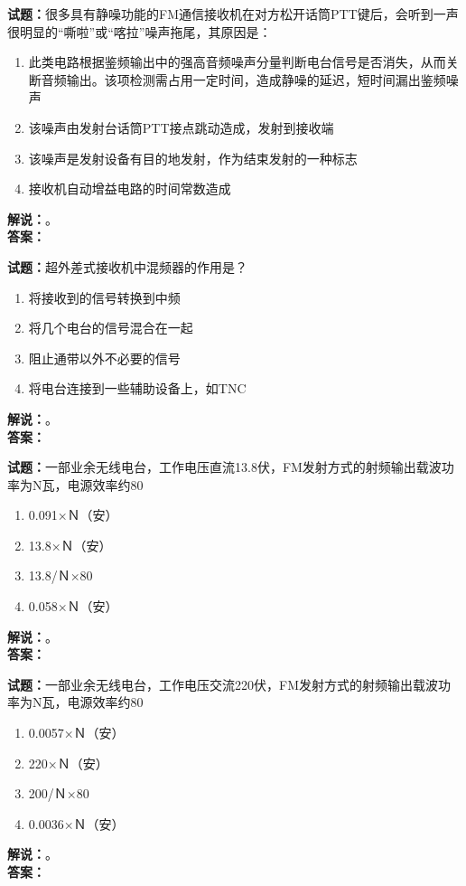 \documentclass{ctexbook}
\begin{document}
\bigskip

\noindent\textbf{试题：}很多具有静噪功能的FM通信接收机在对方松开话筒PTT键后，会听到一声很明显的“嘶啦”或“喀拉”噪声拖尾，其原因是：
\begin{enumerate}[leftmargin=3em]
  \item 此类电路根据鉴频输出中的强高音频噪声分量判断电台信号是否消失，从而关断音频输出。该项检测需占用一定时间，造成静噪的延迟，短时间漏出鉴频噪声
  \item 该噪声由发射台话筒PTT接点跳动造成，发射到接收端
  \item 该噪声是发射设备有目的地发射，作为结束发射的一种标志
  \item 接收机自动增益电路的时间常数造成
\end{enumerate}
\noindent\textbf{解说：}\textbf{}。\\\noindent\textbf{答案：}

\bigskip

\noindent\textbf{试题：}超外差式接收机中混频器的作用是？
\begin{enumerate}[leftmargin=3em]
  \item 将接收到的信号转换到中频
  \item 将几个电台的信号混合在一起
  \item 阻止通带以外不必要的信号
  \item 将电台连接到一些辅助设备上，如TNC
\end{enumerate}
\noindent\textbf{解说：}\textbf{}。\\\noindent\textbf{答案：}

\bigskip

\noindent\textbf{试题：}一部业余无线电台，工作电压直流13.8伏，FM发射方式的射频输出载波功率为N瓦，电源效率约80%
\begin{enumerate}[leftmargin=3em]
  \item 0.091×Ｎ（安）
  \item 13.8×Ｎ（安）
  \item 13.8/Ｎ×80%
  \item 0.058×Ｎ（安）
\end{enumerate}
\noindent\textbf{解说：}\textbf{}。\\\noindent\textbf{答案：}

\bigskip

\noindent\textbf{试题：}一部业余无线电台，工作电压交流220伏，FM发射方式的射频输出载波功率为N瓦，电源效率约80%
\begin{enumerate}[leftmargin=3em]
  \item 0.0057×Ｎ（安）
  \item 220×Ｎ（安）
  \item 200/Ｎ×80%
  \item 0.0036×Ｎ（安）
\end{enumerate}
\noindent\textbf{解说：}\textbf{}。\\\noindent\textbf{答案：}
\end{document}
